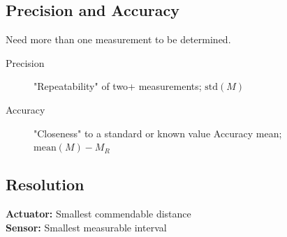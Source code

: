\subsection{Precision and Accuracy}
    Need more than one measurement to be determined.
    \begin{center}
    \end{center}
    \begin{description}
        \item[Precision] "Repeatability" of two+ measurements; $\textrm{std}(M)$ 
        \item[Accuracy] "Closeness" to a standard or known value Accuracy mean; $\textrm{mean}(M) - M_R$
    \end{description}
\subsection{Resolution}
    \textbf{Actuator:} Smallest commendable distance\\
    \textbf{Sensor:} Smallest measurable interval  
